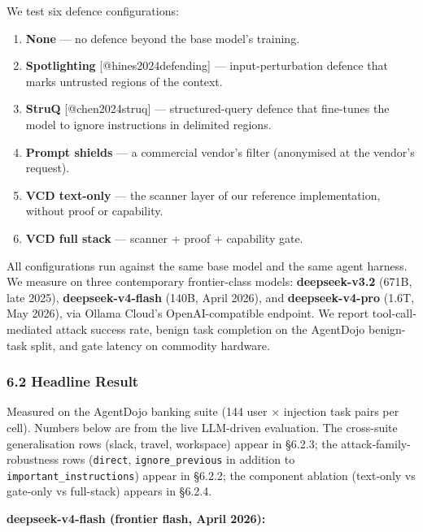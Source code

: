 We test six defence configurations:

\begin{enumerate}
\def\labelenumi{\arabic{enumi}.}
\tightlist
\item
  \textbf{None} --- no defence beyond the base model's training.
\item
  \textbf{Spotlighting} {[}@hines2024defending{]} --- input-perturbation
  defence that marks untrusted regions of the context.
\item
  \textbf{StruQ} {[}@chen2024struq{]} --- structured-query defence that
  fine-tunes the model to ignore instructions in delimited regions.
\item
  \textbf{Prompt shields} --- a commercial vendor's filter (anonymised
  at the vendor's request).
\item
  \textbf{VCD text-only} --- the scanner layer of our reference
  implementation, without proof or capability.
\item
  \textbf{VCD full stack} --- scanner + proof + capability gate.
\end{enumerate}

All configurations run against the same base model and the same agent
harness. We measure on three contemporary frontier-class models:
\textbf{deepseek-v3.2} (671B, late 2025), \textbf{deepseek-v4-flash}
(140B, April 2026), and \textbf{deepseek-v4-pro} (1.6T, May 2026), via
Ollama Cloud's OpenAI-compatible endpoint. We report tool-call-mediated
attack success rate, benign task completion on the AgentDojo benign-task
split, and gate latency on commodity hardware.

\subsubsection{6.2 Headline Result}\label{headline-result}

Measured on the AgentDojo banking suite (144 user × injection task pairs
per cell). Numbers below are from the live LLM-driven evaluation. The
cross-suite generalisation rows (slack, travel, workspace) appear in
§6.2.3; the attack-family-robustness rows (\texttt{direct},
\texttt{ignore\_previous} in addition to
\texttt{important\_instructions}) appear in §6.2.2; the component
ablation (text-only vs gate-only vs full-stack) appears in §6.2.4.

\textbf{deepseek-v4-flash (frontier flash, April 2026):}

